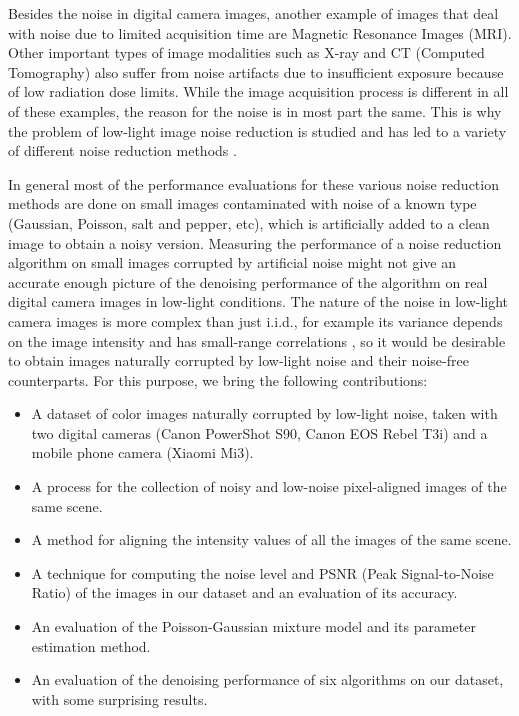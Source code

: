 \documentclass[review]{elsarticle}
\begin{document}
Besides the noise in digital camera images, another example of images that deal with noise due to limited acquisition time are Magnetic Resonance Images (MRI). Other important types of image modalities such as X-ray and CT (Computed Tomography) also suffer from noise artifacts due to insufficient exposure because of low radiation dose limits.  While the image acquisition process is different in all of these examples, the reason for the noise is in most part the same. This is why the problem of low-light image noise reduction is studied and has led to a variety of different noise reduction methods \cite{buades2005non,portilla2003image,dabov2007image,barbu2009training,StochasticImageDenoising,mairal2009non,NeuralNetworkCompete,schmidt2010generative,optMRF}.

In general most of the performance evaluations for these various noise reduction methods are done on small images contaminated with noise of a known type (Gaussian, Poisson, salt and pepper, etc), which is artificially added to a clean image to obtain a noisy version. Measuring the performance of a noise reduction algorithm on small images corrupted by artificial noise might not give an accurate enough picture of the denoising performance of the algorithm on real digital camera images in low-light conditions. The nature of the noise in low-light camera images is more complex than just i.i.d., for example its variance depends on the image intensity \cite{Foi-Poisson} and has small-range correlations \cite{NoiseEstimation}, so it would be desirable to obtain images naturally corrupted by low-light noise and their noise-free counterparts. For this purpose, we bring the following contributions:

\begin{itemize}
\item A dataset of color images naturally corrupted by low-light noise, taken with two digital cameras (Canon PowerShot S90, Canon EOS Rebel T3i) and a mobile phone camera (Xiaomi Mi3).
\item A process for the collection of noisy and low-noise pixel-aligned  images of the same scene.
\item A method for aligning the intensity values of all the images of the same scene.
\item A technique for computing the noise level and PSNR (Peak Signal-to-Noise Ratio) \cite{perceptualdistortion} of the images in our dataset and an evaluation of its accuracy.
\item An evaluation of the Poisson-Gaussian mixture model \cite{Foi-Poisson,makitalo2014noise} and its parameter estimation method.
\item An evaluation of the denoising performance of six algorithms on our dataset, with some surprising results.
\end{itemize}
\end{document}
